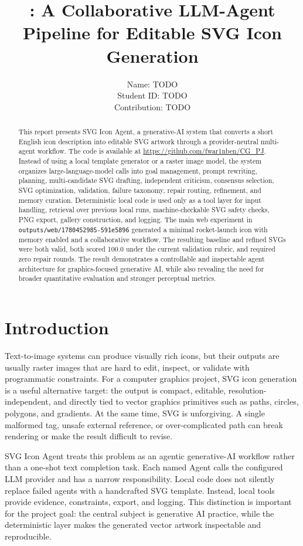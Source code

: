 \documentclass[10pt]{article}
\title{\systemname: A Collaborative LLM-Agent Pipeline for Editable SVG Icon Generation}
\author{
Name: TODO \\
Student ID: TODO \\
Contribution: TODO
}
\date{}
\newcommand{\systemname}{SVG Icon Agent}
\newcommand{\rundir}{\texttt{outputs/web/1780452985-591e5896}}
\begin{document}
\maketitle

\begin{abstract}
This report presents \systemname, a generative-AI system that converts a short English icon description into editable SVG artwork through a provider-neutral multi-agent workflow. The code is available at \url{https://github.com/fwar1nben/CG_PJ}. Instead of using a local template generator or a raster image model, the system organizes large-language-model calls into goal management, prompt rewriting, planning, multi-candidate SVG drafting, independent criticism, consensus selection, SVG optimization, validation, failure taxonomy, repair routing, refinement, and memory curation. Deterministic local code is used only as a tool layer for input handling, retrieval over previous local runs, machine-checkable SVG safety checks, PNG export, gallery construction, and logging. The main web experiment in \rundir{} generated a minimal rocket-launch icon with memory enabled and a collaborative workflow. The resulting baseline and refined SVGs were both valid, both scored 100.0 under the current validation rubric, and required zero repair rounds. The result demonstrates a controllable and inspectable agent architecture for graphics-focused generative AI, while also revealing the need for broader quantitative evaluation and stronger perceptual metrics.
\end{abstract}

\section{Introduction}

Text-to-image systems can produce visually rich icons, but their outputs are usually raster images that are hard to edit, inspect, or validate with programmatic constraints. For a computer graphics project, SVG icon generation is a useful alternative target: the output is compact, editable, resolution-independent, and directly tied to vector graphics primitives such as paths, circles, polygons, and gradients. At the same time, SVG is unforgiving. A single malformed tag, unsafe external reference, or over-complicated path can break rendering or make the result difficult to revise.

\systemname{} treats this problem as an agentic generative-AI workflow rather than a one-shot text completion task. Each named Agent calls the configured LLM provider and has a narrow responsibility. Local code does not silently replace failed agents with a handcrafted SVG template. Instead, local tools provide evidence, constraints, export, and logging. This distinction is important for the project goal: the central subject is generative AI practice, while the deterministic layer makes the generated vector artwork inspectable and reproducible.
\end{document}
